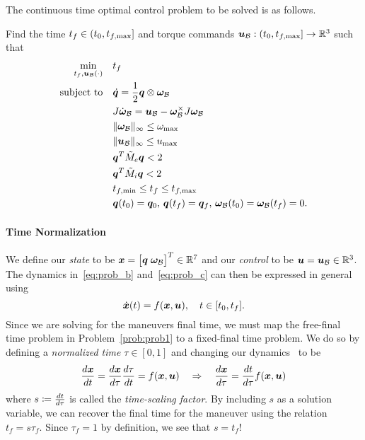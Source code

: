 \documentclass[12pt]{article}
\begin{document}
The continuous time optimal control problem to be solved is as follows. 
\begin{problem}\label{prob:prob1}
Find the time $t_f\in(t_0,t_{f,\max}]$ and torque commands $\bm{u}_{\mathcal{B}} : (t_0,t_{f,\max}] \rightarrow {\mathbb{R}}^3$ such that
\begin{subequations}
\begin{align}
\min_{t_f,\bm{u}_{\mathcal{B}}(\cdot)} &\quad t_f \label{eq:prob_cost}\\
\text{subject to} &\quad \dot{\bm{q}} = \frac{1}{2} \bm{q} \otimes \bm{\omega}_{\mathcal{B}} \label{eq:prob_b}\\
&\quad J \dot{\bm{\omega}}_{\mathcal{B}} = \bm{u}_{\mathcal{B}} - \bm{\omega}_{\mathcal{B}}^{\times} J \bm{\omega}_{\mathcal{B}} \label{eq:prob_c}\\
&\quad \| \bm{\omega}_{\mathcal{B}} \|_{\infty} \leq \omega_{\max} \label{eq:prob_d}\\
&\quad \| \bm{u}_{\mathcal{B}} \|_{\infty} \leq u_{\max} \label{eq:prob_e}\\
&\quad \bm{q}^T \tilde{M}_e \bm{q} < 2 \label{eq:prob_f}\\
&\quad \bm{q}^T \tilde{M}_i \bm{q} < 2 \label{eq:prob_g}\\
&\quad t_{f,\min} \leq t_f \leq t_{f,\max} \label{eq:prob_h}\\
&\quad \bm{q}(t_0) = \bm{q}_0,\, \bm{q}(t_f) = \bm{q}_f,\,\bm{\omega}_{\mathcal{B}}(t_0) = \bm{\omega}_{\mathcal{B}}(t_f) = 0.\label{eq:prob_i}
\end{align}
\end{subequations}
\end{problem} 

\paragraph{Time Normalization}
We define our \textit{state} to be $\bm{x} = \big[ \bm{q} \; \bm{\omega}_{\mathcal{B}} \big]^T \in {\mathbb{R}}^7$ and our \textit{control} to be $\bm{u} = \bm{u}_{\mathcal{B}} \in {\mathbb{R}}^3$. The dynamics in~\eqref{eq:prob_b} and~\eqref{eq:prob_c} can then be expressed in general using
\begin{equation}
\dot{\bm{x}}(t) = f(\bm{x},\bm{u}), \quad t \in [t_0,t_f].
\label{eq:dynamics_general}
\end{equation}
Since we are solving for the maneuvers final time, we must map the free-final time problem in Problem~\ref{prob:prob1} to a fixed-final time problem. We do so by defining a \textit{normalized time} $\tau\in[0,1]$ and changing our dynamics~ to be
\begin{equation}
\frac{d \bm{x}}{d t} = \frac{d \bm{x}}{d \tau}\frac{d \tau}{d t} = f(\bm{x},\bm{u}) \quad \Rightarrow \quad \frac{d \bm{x}}{d \tau} = \frac{d t}{d \tau} f(\bm{x},\bm{u})
\label{eq:dynamics_normalized}
\end{equation}
where $s \coloneqq \frac{d t}{d \tau}$ is called the \textit{time-scaling factor}. By including $s$ as a solution variable, we can recover the final time for the maneuver using the relation $t_f = s \tau_f$. Since $\tau_f = 1$ by definition, we see that $s = t_f$!
\end{document}
